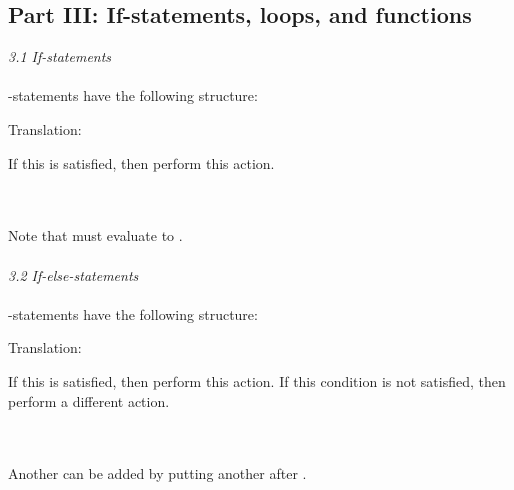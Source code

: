 \subsection{Part III: If-statements, loops, and functions}

\textit{3.1 If-statements} \\
\\
-statements have the following structure: \\


\begin{minipage}[t]{0.2\textwidth}
Translation:
\end{minipage}
\begin{minipage}[t]{0.8\textwidth}
If this  is satisfied, then perform this action.
\end{minipage} \\
\\
Note that  must evaluate to . \\
\\ 
\textit{3.2 If-else-statements} \\
\\
-statements have the following structure: \\


\begin{minipage}[t]{0.2\textwidth}
Translation:
\end{minipage}
\begin{minipage}[t]{0.8\textwidth}
If this  is satisfied, then perform this action. If this condition is not satisfied, then perform a different action.
\end{minipage} \\
\\
Another  can be added by putting another  after . \\

